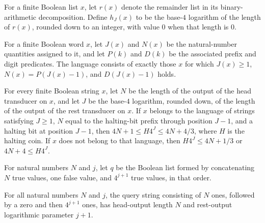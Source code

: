 \begin{definition}
\label{Randomized.hlJ}
\leanok
{}
For a finite Boolean list $x$, let $r(x)$ denote the remainder list in its
binary-arithmetic decomposition. Define $h_J(x)$ to be the base-$4$ logarithm of the
length of $r(x)$, rounded down to an integer, with value $0$ when that length is $0$.
\end{definition}

\begin{definition}
\label{Randomized.haltLang}
\leanok
{}
For a finite Boolean word $x$, let $J(x)$ and $N(x)$ be the natural-number quantities
assigned to it, and let $P(k)$ and $D(k)$ be the associated prefix and digit predicates.
The language consists of exactly those $x$ for which $J(x)\ge 1$, $N(x)=P(J(x)-1)$, and
$D(J(x)-1)$ holds.
\end{definition}

\begin{theorem}
\label{Randomized.haltCoin_mul_pow_hlJ}
\leanok
{}
For every finite Boolean string $x$, let $N$ be the length of the output of the head
transducer on $x$, and let $J$ be the base-$4$ logarithm, rounded down, of the length of
the output of the rest transducer on $x$. If $x$ belongs to the language of strings
satisfying $J \ge 1$, $N$ equal to the halting-bit prefix through position $J-1$, and a
halting bit at position $J-1$, then $4N+1 \le H4^J \le 4N+4/3$, where $H$ is the halting
coin. If $x$ does not belong to that language, then $H4^J \le 4N+1/3$ or $4N+4 \le
H4^J$.
\end{theorem}

\begin{definition}
\label{Randomized.hlQuery}
\leanok
For natural numbers $N$ and $j$, let $q$ be the Boolean list formed by concatenating $N$
true values, one false value, and $4^{j+1}$ true values, in that order.
\end{definition}

\begin{theorem}
\label{Randomized.hlN_hlQuery}
\leanok
{}
For all natural numbers $N$ and $j$, the query string consisting of $N$ ones, followed
by a zero and then $4^{j+1}$ ones, has head-output length $N$ and rest-output
logarithmic parameter $j+1$.
\end{theorem}

